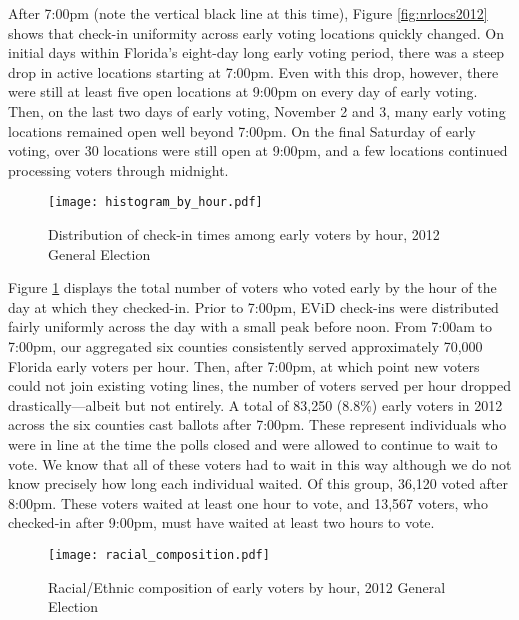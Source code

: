 \documentclass[12pt,titlepage]{article}
\begin{document}
After 7:00pm (note the vertical black line at this time), Figure
\ref{fig:nrlocs2012} shows that check-in uniformity across early
voting locations quickly changed.  On initial days within Florida's
eight-day long early voting period, there was a steep drop in active
locations starting at 7:00pm.  Even with this drop, however, there
were still at least five open locations at 9:00pm on every day of
early voting.  Then, on the last two days of early voting, November 2
and 3, many early voting locations remained open well beyond 7:00pm.
On the final Saturday of early voting, over 30 locations were still
open at 9:00pm, and a few locations continued processing voters
through midnight.

\begin{figure}[!ht]
\caption{Distribution of check-in times among early voters by hour, 2012 General Election}
  \label{fig:hist2012}
  \centering
    \centering\texttt{[image: histogram\_by\_hour.pdf]}
\end{figure}

Figure \ref{fig:hist2012} displays the total number of voters who
voted early by the hour of the day at which they checked-in. Prior to
7:00pm, EViD check-ins were distributed fairly uniformly across the
day with a small peak before noon.  From 7:00am to 7:00pm, our
aggregated six counties consistently served approximately 70,000
Florida early voters per hour. Then, after 7:00pm, at which point new
voters could not join existing voting lines, the number of voters
served per hour dropped drastically---albeit but not entirely.  A
total of 83,250 (8.8\%) early voters in 2012 across the six counties
cast ballots after 7:00pm. These represent individuals who were in
line at the time the polls closed and were allowed to continue to wait
to vote.  We know that all of these voters had to wait in this way
although we do not know precisely how long each individual waited.  Of
this group, 36,120 voted after 8:00pm.  These voters waited at least
one hour to vote, and 13,567 voters, who checked-in after 9:00pm, must
have waited at least two hours to vote.




\begin{figure}[!ht]
\caption{Racial/Ethnic composition of early voters by hour, 2012 General Election}
  \label{fig:race2012}
  \centering
    \centering\texttt{[image: racial\_composition.pdf]}
\end{figure}
\end{document}
